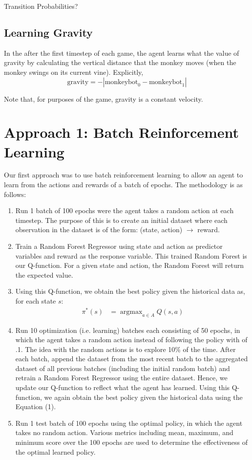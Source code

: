\documentclass[11pt, oneside]{article}   	%
\DeclareMathOperator*{\argmax}{argmax} %
\begin{document}
Transition Probabilities?
\subsection{Learning Gravity}
In the after the first timestep of each game, the agent learns what the value of gravity by calculating the vertical distance that the monkey moves (when the monkey swings on its current vine).  Explicitly,
$$\text{gravity} = -|\text{monkeybot}_{0} - \text{monkeybot}_{1}|$$

Note that, for purposes of the game, gravity is a constant velocity.

\section{Approach 1: Batch Reinforcement Learning}
Our first approach was to use batch reinforcement learning to allow an agent to learn from the actions and rewards of a batch of epochs.  The methodology is as follows:
\begin{enumerate}
  \item Run 1 batch of 100 epochs were the agent takes a random action at each timestep.  The purpose of this is to create an initial dataset where each observation in the dataset is of the form: (state, action) $\longrightarrow$ reward.
  \item Train a Random Forest Regressor using state and action as predictor variables and reward as the response variable.  This trained Random Forest is our Q-function.  For a given state and action, the Random Forest will return the expected value.
  \item Using this Q-function, we obtain the best policy given the historical data as, for each state $s$:
\begin{align}
\pi^{*}(s) &= \argmax_{a\in A} Q(s,a)
\end{align}
  \item Run 10 optimization (i.e. learning) batches each consisting of 50 epochs, in which the agent takes a random action instead of following the policy with of .1. The idea with the random actions is to explore 10\% of the time.  After each batch, append the dataset from the most recent batch to the aggregated dataset of all previous batches (including the initial random batch) and retrain a Random Forest Regressor using the entire dataset.  Hence, we update our Q-function to reflect what the agent has learned.  Using this Q-function, we again obtain the best policy given the historical data using the Equation (1).
  \item Run 1 test batch of 100 epochs using the optimal policy, in which the agent takes no random action.  Various metrics including mean, maximum, and minimum score over the 100 epochs are used to determine the effectiveness of the optimal learned policy.
\end{enumerate}
\end{document}

